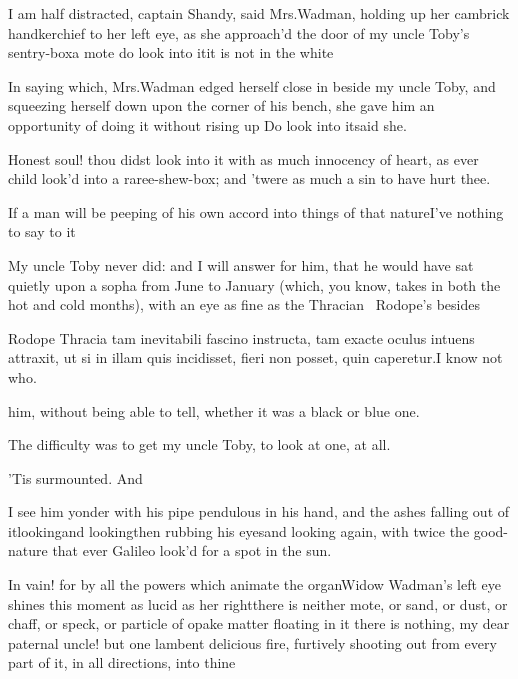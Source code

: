 \documentclass{article}
\begin{document}
\quad\tsh I am half distracted, captain Shandy, said
Mrs.\@ Wadman, holding up her cambrick handkerchief to her
left eye, as she approach’d the door of my uncle
Toby’s sentry-box\tsh a mote \tsh\break
{}
do look into it\tsk it is not in the white\tsk 

In saying which, Mrs.\@ Wadman edged herself close in
beside my uncle Toby, and squeezing herself down upon the
corner of his bench, she gave him an opportunity of doing it without rising up 
\tsh Do look into it\tsk said she.

Honest soul! thou didst look into it with as much innocency of
heart, as ever child look’d into a raree-shew-box; and
’twere as much a sin to have hurt thee.

\tsh If a man will be peeping of his own accord into
things of that nature\tsh I’ve nothing to say to
it\tsh

My uncle Toby never did: and I will answer for him, that he
would have sat quietly upon a sopha from June to January (which,
you know, takes in both the hot and cold months), with an eye as
fine as the Thracian \fnast\  Rodope’s besides\break

\bgroup\small
\indent\fnast\enspace 
Rodope Thracia tam inevitabili fascino\break
instructa, tam exacte oculus intuens attraxit,\break
ut si in illam quis incidisset, fieri non posset,\break
quin caperetur.\tsh I know not who.\par\egroup
{}\eject 
\noindent
him, without being able to tell,
whether it was a black or blue one.

The difficulty was to get my uncle Toby, to look at one,
at all.

’Tis surmounted. And

I see him yonder with his pipe pendulous in his hand, and the
ashes falling out of it\tsk looking\tsk and looking\tsk then
rubbing his eyes\tsh and looking again, with twice the
good-nature that ever Galileo look’d for a spot in the
sun.

\tsh In vain! for by all the powers\break
which animate the organ\tsk Widow\break
Wadman’s left eye shines this
moment as lucid as her right\tsk there is neither mote, or
sand, or dust, or chaff, or speck, or particle of opake matter
floating in it \tsk there is nothing, my dear paternal uncle! but
one lambent delicious fire, furtively shooting out from every part
of it, in all directions, into thine\tsh
\end{document}
